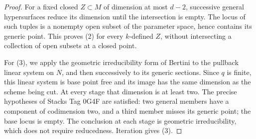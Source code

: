 \begin{proof}
For a fixed closed $Z\subset M$ of dimension at most $d-2$,
successive general hypersurfaces reduce its dimension until the
intersection is empty.  The locus of such tuples is a nonempty
open subset of the parameter space, hence contains its generic
point.  This proves (2) for every $k$-defined $Z$, without
intersecting a collection of open subsets at a closed point.

For (3), we apply the geometric irreducibility form of Bertini
to the pullback linear system on $N$, and then successively to
its generic sections.  Since $q$ is finite, this linear system
is base point free and its image has the same dimension as the
scheme being cut.  At every stage that dimension is at least two.
The precise hypotheses of Stacks Tag 0G4F are satisfied: two
general members have a component of codimension two, and a third
member misses its generic point; the base locus is empty.
The conclusion at each stage is geometric irreducibility, which
does not require reducedness.  Iteration gives (3).
\end{proof}

